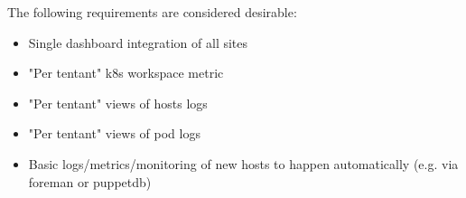 The following requirements are considered desirable:

\begin{itemize}
    \item Single dashboard integration of all sites
    \item "Per tentant" k8s workspace metric
    \item "Per tentant" views of hosts logs
    \item "Per tentant" views of pod logs
    \item Basic logs/metrics/monitoring of new hosts to happen automatically (e.g. via foreman or puppetdb)
\end{itemize} 